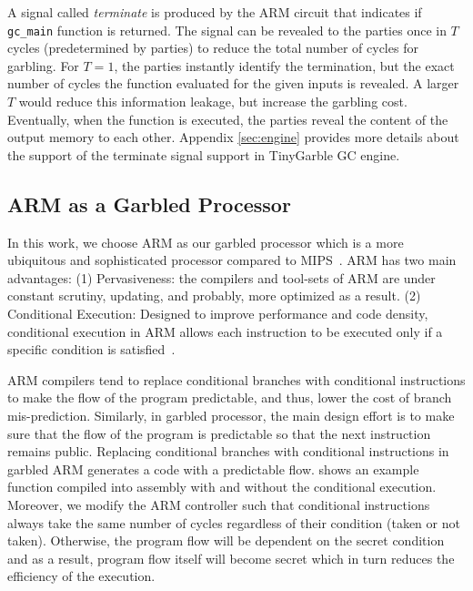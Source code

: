 A signal called \textit{terminate} is produced by the ARM circuit that indicates if \texttt{gc\_main} function is returned.
The signal can be revealed to the parties once in $T$ cycles (predetermined by parties) to reduce the total number of cycles for garbling.
For $T=1$, the parties instantly identify the termination, but the exact number of cycles the function evaluated for the given inputs is revealed.
A larger $T$ would reduce this information leakage, but increase the garbling cost.
Eventually, when the function is executed, the parties reveal the content of the output memory to each other.
Appendix \ref{sec:engine} provides more details about the support of the terminate signal support in TinyGarble GC engine.

\subsection{ARM as a Garbled Processor}\label{ssec:arm}
In this work, we choose ARM as our garbled processor which is a more ubiquitous and sophisticated processor compared to MIPS~\cite{songhori2015tinygarble, wang2016secure, songhori2016garbledcpu}.
ARM has two main advantages:
(1) Pervasiveness: the compilers and tool-sets of ARM are under constant scrutiny, updating, and probably, more optimized as a result.
(2) Conditional Execution: Designed to improve performance and code density, conditional execution in ARM allows each instruction to be executed only if a specific condition is satisfied~\cite{sloss2004arm}.

ARM compilers tend to replace conditional branches with conditional instructions to make the flow of the program predictable, and thus, lower the cost of branch mis-prediction.
Similarly, in garbled processor, the main design effort is to make sure that the flow of the program is predictable so that the next instruction remains public.
Replacing conditional branches with conditional instructions in garbled ARM generates a code with a predictable flow.
 shows an example function compiled into assembly with and without the conditional execution.
Moreover, we modify the ARM controller such that conditional instructions always take the same number of cycles regardless of their condition (taken or not taken). Otherwise, the program flow will be dependent on the secret condition and as a result, program flow itself will become secret which in turn reduces the efficiency of the execution.

